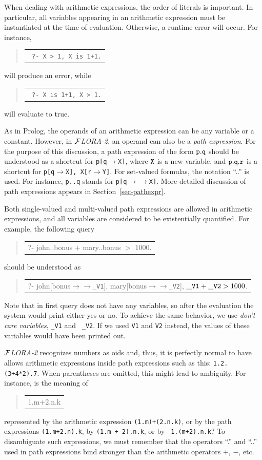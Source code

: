 \documentclass[11pt]{article}
\newenvironment{qrules}{\begin{quote}\tt\begin{tabular}[t]{l}}%
{\end{tabular}\end{quote}}
\newcommand{\fd}{\ensuremath{{\rightarrow}}}                   %
\newcommand{\mvd}{\ensuremath{{\rightarrow\!\!\!\!\rightarrow}}}  %
\newcommand{\FLORA}{{\mbox{${\cal F}${\small\it LORA}\rm\emph{-2}}}\xspace}
\begin{document}
When dealing with arithmetic expressions, the order of literals is
important.  In particular, all variables appearing in an arithmetic
expression must be instantiated at the time of evaluation. Otherwise, a
runtime error will occur. For instance, 
\begin{qrules}
  \tt
?- X > 1, X is 1+1.
\end{qrules}
will produce an error, while
\begin{qrules}
  \tt
?- X is 1+1, X > 1.
\end{qrules}
will evaluate to true.

As in Prolog, the operands of an arithmetic expression can be any variable
or a constant. However, in \FLORA, an operand can also be a \emph{path
  expression}. For the purpose of this discussion, a path expression of the
form $\tt p.q$ should be understood as a shortcut for {\tt p[q$\fd$X]}, where
$\tt X$ is a new variable, and $\tt p.q.r$ is a shortcut for {\tt p[q$\fd$X],
  X[r$\fd$Y]}. For set-valued formulas, the notation ``..'' is used. For
instance, {\tt p..q} stands for {\tt p[q$\mvd$X]}. More detailed discussion
of path expressions appears in Section~\ref{sec-pathexpr}.

Both single-valued and multi-valued path expressions are allowed in
arithmetic expressions, and all variables are considered to be
existentially quantified. For example, the following query
\begin{qrules}
?- john..bonus $+$ mary..bonus $>$ 1000.
\end{qrules}
should be understood as
\begin{qrules}
?- john[bonus{\mvd}{\tt \_V1}], mary[bonus{\mvd}{\tt \_V2}], ${\tt \_V1}+{\tt \_V2} > 1000$.
\end{qrules}
Note that in first query does not have any variables, so after the
evaluation the system would print either yes or no. To achieve the same
behavior, we use \emph{don't care variables}, {\tt \_V1} and {\tt
  \_V2}. If we used {\tt V1} and {\tt V2} instead, the values of these
variables would have been printed out.

\FLORA recognizes numbers as oids and, thus, it is perfectly normal to have
allows arithmetic expressions inside path expressions such as this:
{\tt 1.2.(3+4*2).7}. When parentheses are omitted, this might lead to
ambiguity.
For instance, is the meaning of
\begin{qrules}
1.m+2.n.k
\end{qrules}
represented by
the arithmetic expression {\tt (1.m)+(2.n.k)}, or by
the path expressions {\tt (1.m+2.n).k}, by {\tt (1.m + 2).n.k}, or by {\tt
  1.(m+2).n.k}? To disambiguate such expressions, we must remember that the
operators ``.'' and ``..'' used in path expressions bind stronger than the
arithmetic operators $+$, $-$, etc.
\end{document}
